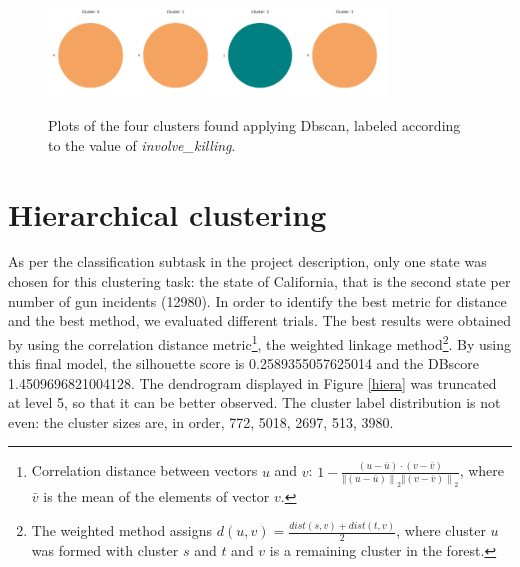 \documentclass[10pt,a4paper]{report}
\begin{document}
\begin{figure}[h]
	\centering
	\includegraphics[width=0.2\textwidth]{dbscan_0}\includegraphics[width=0.2\textwidth]{dbscan_1}\includegraphics[width=0.2\textwidth]{dbscan_2}\includegraphics[width=0.2\textwidth]{dbscan_3}
	\caption{Plots of the four clusters found applying Dbscan, labeled according to the value of \textit{involve\_killing}.}
	\label{xmeans_killing}
\end{figure}

\section{Hierarchical clustering}

As per the classification subtask in the project description, only one state was chosen for this clustering task: the state of California, that is the second state per number of gun incidents (12980).
In order to identify the best metric for distance and the best method, we evaluated different trials.
The best results were obtained by using the correlation distance metric\footnote{Correlation distance between vectors $u$ and $v$: $1 - \frac{(u-\bar{u})\cdot(v-\bar{v})}{\left \Vert (u-\bar{u}) \right \|_2 \left \Vert (v-\bar{v}) \right \|_2}$, where $\bar{v}$ is the mean of the elements of vector $v$.}, the weighted linkage method\footnote{The weighted method assigns $d(u,v) = \frac{dist(s,v)+dist(t,v)}{2}$, where cluster $u$ was formed with cluster $s$ and $t$ and $v$ is a remaining cluster in the forest.}.
By using this final model, the silhouette score is 0.2589355057625014 and the DBscore 1.4509696821004128.
The dendrogram displayed in Figure \ref{hiera} was truncated at level 5, so that it can be better observed.
The cluster label distribution is not even: the cluster sizes are, in order, 772, 5018, 2697, 513, 3980.
\end{document}
